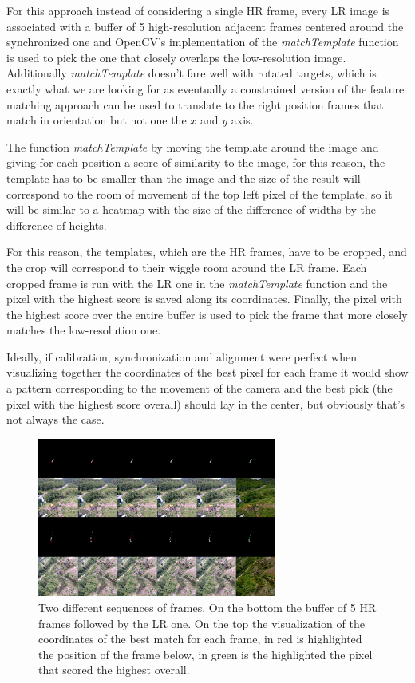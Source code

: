 For this approach instead of considering a single HR frame, every LR image is associated with a buffer of 5 high-resolution adjacent frames centered around the synchronized one and OpenCV's implementation of the \emph{matchTemplate} function is used to pick the one that closely overlaps the low-resolution image. Additionally \emph{matchTemplate} doesn't fare well with rotated targets, which is exactly what we are looking for as eventually a constrained version of the feature matching approach can be used to translate to the right position frames that match in orientation but not one the \(x\) and \(y\) axis.\newline

The function \emph{matchTemplate} by moving the template around the image and giving for each position a score of similarity to the image, for this reason, the template has to be smaller than the image and the size of the result will correspond to the room of movement of the top left pixel of the template, so it will be similar to a heatmap with the size of the difference of widths by the difference of heights.

For this reason, the templates, which are the HR frames, have to be cropped, and the crop will correspond to their wiggle room around the LR frame. Each cropped frame is run with the LR one in the \emph{matchTemplate} function and the pixel with the highest score is saved along its coordinates. Finally, the pixel with the highest score over the entire buffer is used to pick the frame that more closely matches the low-resolution one.

Ideally, if calibration, synchronization and alignment were perfect when visualizing together the coordinates of the best pixel for each frame it would show a pattern corresponding to the movement of the camera and the best pick (the pixel with the highest score overall) should lay in the center, but obviously that's not always the case.

\begin{figure}[H]
  \centering
  \includegraphics[width=0.7\textwidth]{figures/matchtemplate.png}
  \caption{Two different sequences of frames. On the bottom the buffer of 5 HR frames followed by the LR one. On the top the visualization of the coordinates of the best match for each frame, in red is highlighted the position of the frame below, in green is the highlighted the pixel that scored the highest overall.}
  \label{img:matchtempl}
\end{figure}

